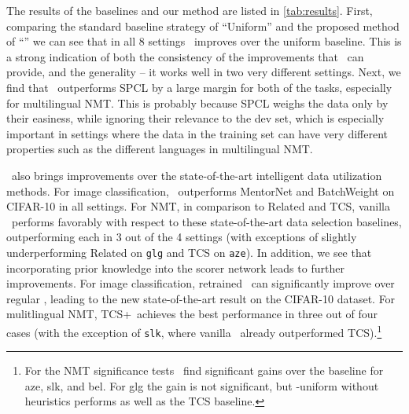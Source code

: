 
The results of the baselines and our method are listed in \autoref{tab:results}.
First, comparing the standard baseline strategy of ``Uniform'' and the proposed method of ``\dds'' we can see that in all 8 settings \dds~improves over the uniform baseline. This is a strong indication of both the consistency of the improvements that \dds~can provide, and the generality -- it works well in two very different settings. Next, we find that \dds~outperforms SPCL by a large margin for both of the tasks, especially for multilingual NMT. This is probably because SPCL weighs the data only by their easiness, while ignoring their relevance to the dev set, which is especially important in settings where the data in the training set can have very different properties such as the different languages in multilingual NMT. 

\dds~also brings improvements over the state-of-the-art intelligent data utilization methods. For image classification, \dds~outperforms MentorNet and BatchWeight on CIFAR-10 in all settings. For NMT, in comparison to Related and TCS, vanilla \dds~performs favorably with respect to these state-of-the-art data selection baselines, outperforming each in 3 out of the 4 settings (with exceptions of slightly underperforming Related on \texttt{glg} and TCS on \texttt{aze}).
In addition, we see that incorporating prior knowledge into the scorer network leads to further improvements. For image classification, retrained \dds~can significantly improve over regular \dds, leading to the new state-of-the-art result on the CIFAR-10 dataset. For mulitlingual NMT, TCS+\dds~achieves the best performance in three out of four cases (with the exception of \texttt{slk}, where vanilla \dds~already outperformed TCS).\footnote{For the NMT significance tests~\citep{significance_nmt} find significant gains over the baseline for aze, slk, and bel. For glg the gain is not significant, but \dds-uniform without heuristics performs as well as the TCS baseline.}

